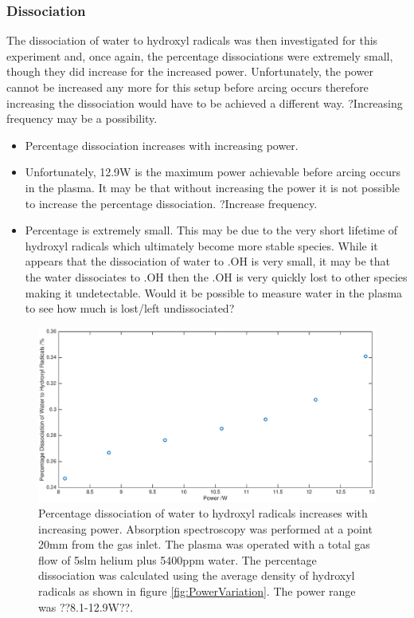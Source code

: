 \documentclass[11pt, oneside]{article}   	%
\begin{document}
\subsubsection{Dissociation}

The dissociation of water to hydroxyl radicals was then investigated for this experiment and, once again, the percentage dissociations were extremely small, though they did increase for the increased power. 
Unfortunately, the power cannot be increased any more for this setup before arcing occurs therefore increasing the dissociation would have to be achieved a different way. ?Increasing frequency may be a possibility.

\begin{itemize}
    \item Percentage dissociation increases with increasing power.
    \item Unfortunately, 12.9W is the maximum power achievable before arcing occurs in the plasma. It may be that without increasing the power it is not possible to increase the percentage dissociation. ?Increase frequency.
    \item Percentage is extremely small. This may be due to the very short lifetime of hydroxyl radicals which ultimately become more stable species. While it appears that the dissociation of water to .OH is very small, it may be that the water dissociates to .OH then the .OH is very quickly lost to other species making it undetectable. Would it be possible to measure water in the plasma to see how much is lost/left undissociated?
\end{itemize}

\begin{figure}
    \centering
    \includegraphics[width=\textwidth]{Figures/PowerDissociation.eps}
    \caption{Percentage dissociation of water to hydroxyl radicals increases with increasing power. Absorption spectroscopy was performed at a point 20mm from the gas inlet. The plasma was operated with a total gas flow of 5slm helium plus 5400ppm water. The percentage dissociation was calculated using the average density of hydroxyl radicals as shown in figure \ref{fig:PowerVariation}. The power range was ??8.1-12.9W??.}
    \label{fig:PowerDissociation}
\end{figure}
\end{document}
